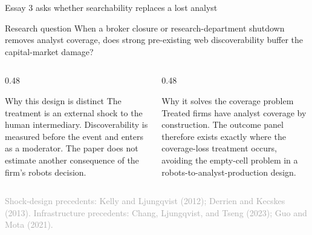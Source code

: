\documentclass[aspectratio=169,10pt]{beamer}
\newcommand{\source}[1]{\vfill{\scriptsize\textcolor{DarkGray}{#1}}}
\begin{document}
\begin{frame}[t]{Essay 3 asks whether searchability replaces a lost analyst}
\begin{block}{Research question}
\large
When a broker closure or research-department shutdown removes analyst coverage, does strong pre-existing web discoverability buffer the capital-market damage?
\end{block}

\footnotesize
\begin{columns}[T,onlytextwidth]
  \begin{column}{0.48\textwidth}
    \begin{block}{Why this design is distinct}
      The treatment is an external shock to the human intermediary. Discoverability is measured before the event and enters as a moderator. The paper does not estimate another consequence of the firm's robots decision.
    \end{block}
  \end{column}
  \begin{column}{0.48\textwidth}
    \begin{block}{Why it solves the coverage problem}
      Treated firms have analyst coverage by construction. The outcome panel therefore exists exactly where the coverage-loss treatment occurs, avoiding the empty-cell problem in a robots-to-analyst-production design.
    \end{block}
  \end{column}
\end{columns}

\source{Shock-design precedents: Kelly and Ljungqvist (2012); Derrien and Kecskes (2013). Infrastructure precedents: Chang, Ljungqvist, and Tseng (2023); Guo and Mota (2021).}
\end{frame}
\end{document}
